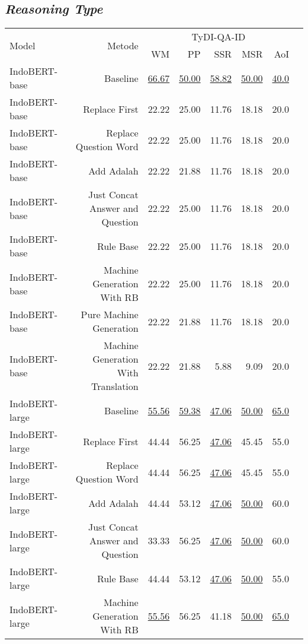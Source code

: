 \subsection{\emph{Reasoning Type}}
\begin{table}[H]\centering
\footnotesize
\begin{tabular}{lrrrrrrr}\toprule
\multirow{2}{*}{Model} &\multirow{2}{*}{Metode} &\multicolumn{5}{c}{TyDI-QA-ID} \\\cmidrule{3-7}
& &WM &PP &SSR &MSR &AoI \\\midrule
IndoBERT-base &Baseline &\underline{66.67} &\underline{50.00} &\underline{58.82} &\underline{50.00} &\underline{40.0} \\
IndoBERT-base &Replace First &22.22 &25.00 &11.76 &18.18 &20.0 \\
IndoBERT-base &Replace Question Word &22.22 &25.00 &11.76 &18.18 &20.0 \\
IndoBERT-base &Add Adalah &22.22 &21.88 &11.76 &18.18 &20.0 \\
IndoBERT-base &Just Concat Answer and Question &22.22 &25.00 &11.76 &18.18 &20.0 \\
IndoBERT-base &Rule Base &22.22 &25.00 &11.76 &18.18 &20.0 \\
IndoBERT-base &Machine Generation With RB &22.22 &25.00 &11.76 &18.18 &20.0 \\
IndoBERT-base &Pure Machine Generation &22.22 &21.88 &11.76 &18.18 &20.0 \\
IndoBERT-base &Machine Generation With Translation &22.22 &21.88 &5.88 &9.09 &20.0 \\
\hline
IndoBERT-large &Baseline &\underline{55.56} &\underline{59.38} &\underline{47.06} &\underline{50.00} &\underline{65.0} \\
IndoBERT-large &Replace First &44.44 &56.25 &\underline{47.06} &45.45 &55.0 \\
IndoBERT-large &Replace Question Word &44.44 &56.25 &\underline{47.06} &45.45 &55.0 \\
IndoBERT-large &Add Adalah &44.44 &53.12 &\underline{47.06} &\underline{50.00} &60.0 \\
IndoBERT-large &Just Concat Answer and Question &33.33 &56.25 &\underline{47.06} &\underline{50.00} &60.0 \\
IndoBERT-large &Rule Base &44.44 &53.12 &\underline{47.06} &\underline{50.00} &55.0 \\
IndoBERT-large &Machine Generation With RB &\underline{55.56} &56.25 &41.18 &\underline{50.00} &\underline{65.0} \\

\end{tabular}
\end{table}
